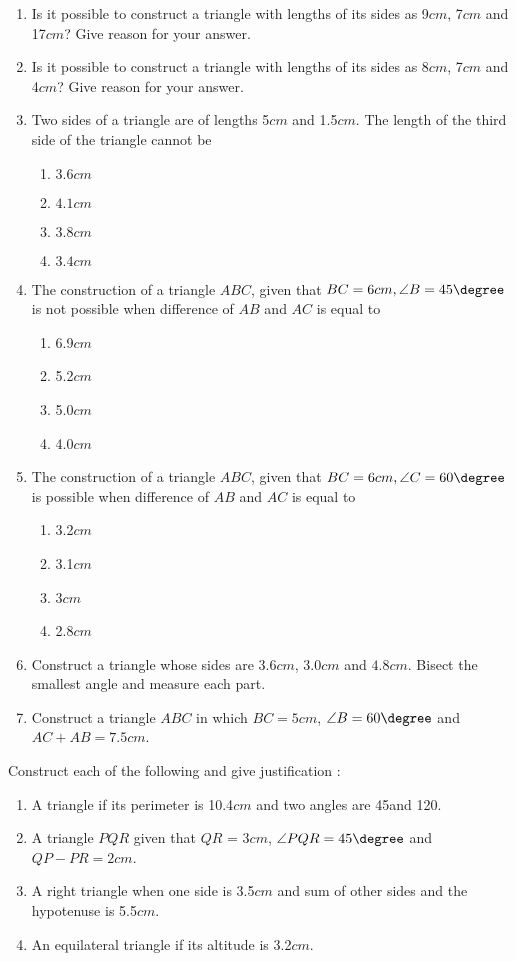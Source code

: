 \begin{enumerate}[label=\thesubsection.\arabic*,ref=\thesubsection.\theenumi]
\item Is it possible to construct a triangle with lengths of its sides as 9$cm$, 7$cm$ and 17$cm$? Give reason for your answer.

\item Is it possible to construct a triangle with lengths of its sides as 8$cm$, 7$cm$ and 4$cm$? Give reason for your answer.

\item Two sides of a triangle are of lengths 5$cm$ and 1.5$cm$. The length of the third side of the triangle cannot be
\begin{enumerate}
\item $3.6 cm$
\item $4.1 cm$
\item $3.8 cm$
\item $3.4 cm$
\end{enumerate}
\item The construction of a triangle $ABC$, given that $BC = 6 cm, \angle B = 45\degree$ is not possible when difference of $AB$ and $AC$ is equal to
		\begin{enumerate}
			\item 6.9$cm$
			\item 5.2$cm$
			\item 5.0$cm$
			\item 4.0$cm$
		\end{enumerate}
	\item The construction of a triangle $ABC$, given that $BC = 6 cm, \angle C = 60\degree$ is possible when difference of $AB$ and $AC$ is equal to
		\begin{enumerate}
			\item 3.2$cm$
			\item 3.1$cm$
			\item 3$cm$
			\item 2.8$cm$
		\end{enumerate}
\item Construct a triangle whose sides are $3.6 cm$, $3.0 cm$ and $4.8 cm$. Bisect the smallest angle and measure each part.
\item Construct a triangle $ABC$ in which $BC = 5 cm$, $\angle B = 60\degree$ and $AC+AB = 7.5cm$.
\end{enumerate}
Construct each of the following and give justification :
\begin{enumerate}[label=\thesubsection.\arabic*,ref=\thesubsection.\theenumi,resume*]
\item A triangle if its perimeter is 10.4$cm$ and two angles are 45\degree and 120\degree.
\item A triangle $PQR$ given that $QR$ = 3$cm$, $\angle PQR = 45\degree$ and $QP - PR = 2 cm$.
\item A right triangle when one side is 3.5$cm$ and sum of other sides and the hypotenuse
is 5.5$cm$.
\item An equilateral triangle if its altitude is 3.2$cm$.
\end{enumerate}                               

